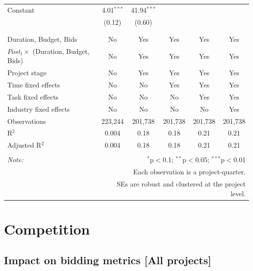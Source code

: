 \documentclass[
]{article}
\begin{document}
\begin{table}[H]
\begin{tabular}{@{\extracolsep{-2pt}}lccccc}
 Constant & 4.01$^{***}$ & 41.94$^{***}$ &  &  &  \\ 
  & (0.12) & (0.60) &  &  &  \\ 
  & & & & & \\ 
\hline \\[-1.8ex] 
Duration, Budget, Bids & No & Yes & Yes & Yes & Yes \\ 
$Post_t \times $  (Duration, Budget, Bids) & No & Yes & Yes & Yes & Yes \\ 
Project stage & No & Yes & Yes & Yes & Yes \\ 
Time fixed effects & No & No & Yes & Yes & Yes \\ 
Task fixed effects & No & No & No & Yes & Yes \\ 
Industry fixed effects & No & No & No & No & Yes \\ 
Observations & 223,244 & 201,738 & 201,738 & 201,738 & 201,738 \\ 
R$^{2}$ & 0.004 & 0.18 & 0.18 & 0.21 & 0.21 \\ 
Adjusted R$^{2}$ & 0.004 & 0.18 & 0.18 & 0.21 & 0.21 \\ 
\hline 
\hline \\[-1.8ex] 
\textit{Note:}  & \multicolumn{5}{r}{$^{*}$p$<$0.1; $^{**}$p$<$0.05; $^{***}$p$<$0.01} \\ 
 & \multicolumn{5}{r}{Each observation is a project-quarter.} \\ 
 & \multicolumn{5}{r}{SEs are robust and clustered at the project level.} \\ 
\end{tabular} 
\end{table}

\hypertarget{competition}{%
\section{Competition}\label{competition}}

\hypertarget{impact-on-bidding-metrics-all-projects}{%
\subsection{Impact on bidding metrics {[}All
projects{]}}\label{impact-on-bidding-metrics-all-projects}}
\end{document}
